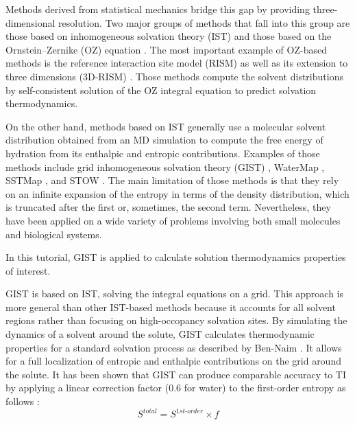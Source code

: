 \documentclass[9pt,tutorial]{livecoms}
\begin{document}
Methods derived from statistical mechanics bridge this gap by providing three-dimensional resolution.
Two major groups of methods that fall into this group are those based on inhomogeneous solvation theory (IST) \cite{Lazaridis1998} and those based on the Ornstein--Zernike (OZ) equation \cite{Hansen2013-simple-liquids}.
The most important example of OZ-based methods is the reference interaction site model (RISM) \cite{Chandler1972-rism} as well as its extension to three dimensions (3D-RISM) \cite{Kovalenko1998-3drism}.
Those methods compute the solvent distributions by self-consistent solution of the OZ integral equation to predict solvation thermodynamics.

On the other hand, methods based on IST generally use a molecular solvent distribution obtained from an MD simulation to compute the free energy of hydration from its enthalpic and entropic contributions.
Examples of those methods include grid inhomogeneous solvation theory (GIST) \cite{Nguyen2012,Ramsey2016}, WaterMap \cite{Young2007-watermap,Abel2008-watermap}, SSTMap \cite{Haider2018-sstmap}, and STOW \cite{Li2012-stow}.
The main limitation of those methods is that they rely on an infinite expansion of the entropy in terms of the density distribution, which is truncated after the first or, sometimes, the second \cite{Nguyen2016-gist-second-order,Waibl2022-gist-solvents} term.
Nevertheless, they have been applied on a wide variety of problems involving both small molecules and biological systems.

In this tutorial, GIST is applied to calculate solution thermodynamics properties of interest. 

GIST is based on IST, solving the integral equations on a grid. 
This approach is more general than other IST-based methods because it accounts for all solvent regions rather than focusing on high-occopancy solvation sites.
By simulating the dynamics of a solvent around the solute, GIST calculates thermodynamic properties for a standard solvation process as described by Ben-Naim \cite{ben-naim-book}.
It allows for a full localization of entropic and enthalpic contributions on the grid around the solute.
It has been shown that GIST can produce comparable accuracy to TI by applying a linear correction factor (0.6 for water) to the first-order entropy as follows \cite{Chen2021,Waibl2022-gist-solvents}:
\begin{equation}
S^\textit{total} = S^\textit{1st-order} \times f
\end{equation}
\end{document}
